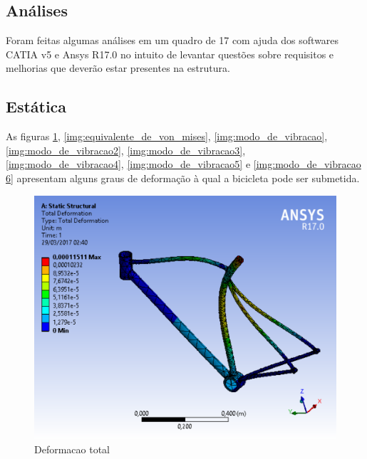 \newpage

	\subsection{Análises}
	Foram feitas algumas análises em um quadro de 17 com ajuda dos softwares CATIA v5 e Ansys R17.0 no intuito de levantar questões sobre requisitos e melhorias que deverão estar presentes na estrutura.
	
	\subsection{Estática}
	As figuras \ref{img:deformacao_total}, \ref{img:equivalente_de_von_mises}, \ref{img:modo_de_vibracao}, \ref{img:modo_de_vibracao2}, \ref{img:modo_de_vibracao3}, \ref{img:modo_de_vibracao4}, \ref{img:modo_de_vibracao5} e \ref{img:modo_de_vibracao 6} apresentam alguns graus de deformação à qual a bicicleta pode ser submetida. 	
	
\graphicspath{{figuras/}}
	\begin{figure}[h!]
	\centering
	\includegraphics[scale=0.90]{deformacao_total.png}
	\caption{Deformacao total}
	\label{img:deformacao_total}
	\end{figure}	
	
